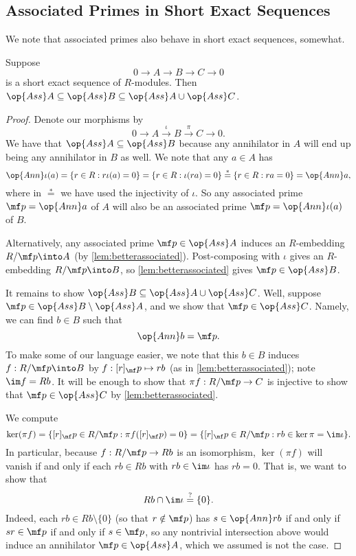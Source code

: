 \subsection{Associated Primes in Short Exact Sequences}
We note that associated primes also behave in short exact sequences, somewhat.
\begin{lemma} \label{lem:assses}
	Suppose
	\[0\to A\to B\to C\to 0\]
	is a short exact sequence of $R$-modules. Then $\op{Ass}A\subseteq\op{Ass}B\subseteq\op{Ass}A\cup\op{Ass}C$.
\end{lemma}
\begin{proof}
	Denote our morphisms by
	\[0\to A\stackrel\iota\to B\stackrel\pi\to C\to 0.\]
	We have that $\op{Ass}A\subseteq\op{Ass}B$ because any annihilator in $A$ will end up being any annihilator in $B$ as well. We note that any $a\in A$ has
	\[\op{Ann}\iota(a)=\{r\in R:r\iota(a)=0\}=\{r\in R:\iota(ra)=0\}\stackrel*=\{r\in R:ra=0\}=\op{Ann}a,\]
	where in $\stackrel*=$ we have used the injectivity of $\iota$. So any associated prime $\mf p=\op{Ann}a$ of $A$ will also be an associated prime $\mf p=\op{Ann}\iota(a)$ of $B$.
	\begin{remark}[Nir]
		Alternatively, any associated prime $\mf p\in\op{Ass}A$ induces an $R$-embedding $R/\mf p\into A$ (by \autoref{lem:betterassociated}). Post-composing with $\iota$ gives an $R$-embedding $R/\mf p\into B$, so \autoref{lem:betterassociated} gives $\mf p\in\op{Ass}B$.
	\end{remark}

	It remains to show $\op{Ass}B\subseteq\op{Ass}A\cup\op{Ass}C$. Well, suppose $\mf p\in\op{Ass}B\setminus\op{Ass}A$, and we show that $\mf p\in\op{Ass}C$. Namely, we can find $b\in B$ such that
	\[\op{Ann}b=\mf p.\]
	To make some of our language easier, we note that this $b\in B$ induces $f:R/\mf p\into B$ by $f:[r]_\mf p\mapsto rb$ (as in \autoref{lem:betterassociated}); note $\im f=Rb$. It will be enough to show that $\pi f:R/\mf p\to C$ is injective to show that $\mf p\in\op{Ass}C$ by \autoref{lem:betterassociated}.
	
	We compute
	\[\ker(\pi f)=\{[r]_\mf p\in R/\mf p:\pi f([r]_\mf p)=0\}=\{[r]_\mf p\in R/\mf p:rb\in\ker\pi=\im\iota\}.\]
	In particular, because $f:R/\mf p\to Rb$ is an isomorphism, $\ker(\pi f)$ will vanish if and only if each $rb\in Rb$ with $rb\in\im\iota$ has $rb=0$. That is, we want to show that
	\[Rb\cap\im\iota\stackrel?=\{0\}.\]
	Indeed, each $rb\in Rb\setminus\{0\}$ (so that $r\notin\mf p$) has $s\in\op{Ann}rb$ if and only if $sr\in\mf p$ if and only if $s\in\mf p$, so any nontrivial intersection above would induce an annihilator $\mf p\in\op{Ass}A$, which we assumed is not the case.
\end{proof}
